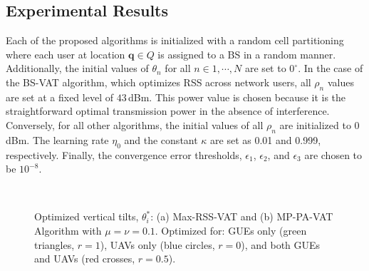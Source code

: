 \subsection{Experimental Results}\label{Experimental-Results}

Each of the proposed algorithms is initialized with a random cell partitioning where each user at location $\bm{q}\in Q$ is assigned to a BS in a random manner. Additionally, the initial values of $\theta_n$ for all $n \in {1, \cdots, N}$ are set to $0^\circ$. In the case of the BS-VAT algorithm, which optimizes RSS  across network users, all $\rho_n$ values are set at a fixed level of $43$\,dBm. This power value is chosen because it is the straightforward optimal transmission power in the absence of interference. Conversely, for all other algorithms, the initial values of all $\rho_n$ are initialized to $0$\,dBm. The learning rate $\eta_0$ and the constant $\kappa$ are set as 0.01 and 0.999, respectively. Finally, the convergence error thresholds, $\epsilon_1$, $\epsilon_2$, and $\epsilon_3$ are chosen to be $10^{-8}$.


\begin{figure}[!t]
\centering
{}
\hspace{0mm}\\
\vspace*{3mm}
\captionsetup{justification=justified}
\caption{Optimized vertical tilts,  $\theta_i^*$: (a) Max-RSS-VAT and (b) MP-PA-VAT Algorithm with $\mu =\nu = 0.1$. Optimized for: GUEs only (green triangles, $r=1$), UAVs only (blue circles, $r=0$), and both GUEs and UAVs (red crosses, $r=0.5$).}
\label{TWC-Optimal-Theta}
\end{figure}


